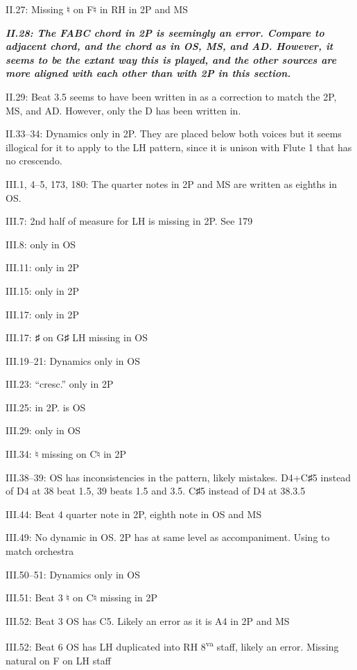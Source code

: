 \documentclass[twoside]{article}
\newcommand\dynmark[1]{\scalebox{0.9}{#1}{\kern1pt}}
\begin{document}
\begin{hangparas}{15pt}{1}
\begin{multicols}{2}
II.27: Missing ♮ on F♮ in RH in 2P and MS

\textbf{\textit{II.28: The FABC chord in 2P is seemingly an error. Compare to adjacent chord, and the chord as in OS, MS, and AD. However, it seems to be the extant way this is played, and the other sources are more aligned with each other than with 2P in this section.}}

II.29: Beat 3.5 seems to have been written in as a correction to match the 2P, MS, and AD. However, only the D has been written in.

II.33--34: Dynamics only in 2P. They are placed below both voices but it seems illogical for it to apply to the LH pattern, since it is unison with Flute 1 that has no crescendo.

III.1, 4--5, 173, 180: The quarter notes in 2P and MS are written as eighths in OS.

III.7: 2nd half of measure for LH is missing in 2P. See 179

III.8: \dynmark{\mf} only in OS

III.11: \dynmark{\ff} only in 2P

III.15: \dynmark{\f} only in 2P	

III.17: \dynmark{\p} only in 2P

III.17: ♯ on G♯ LH missing in OS

III.19--21: Dynamics only in OS

III.23: ``cresc.'' only in 2P

III.25: \dynmark{\f} in 2P. \dynmark{\ff} is OS

III.29: \dynmark{\ff} only in OS

III.34: ♮ missing on C♮ in 2P

III.38--39: OS has inconsistencies in the pattern, likely mistakes. D4+C♯5 instead of D4 at 38 beat 1.5, 39 beats 1.5 and 3.5. C♯5 instead of D4 at 38.3.5

III.44: Beat 4 quarter note in 2P, eighth note in OS and MS

III.49: No dynamic in OS. 2P has \dynmark{\pp} at same level as accompaniment. Using \dynmark{\p} to match orchestra

III.50--51: Dynamics only in OS

III.51: Beat 3 ♮ on C♮ missing in 2P

III.52: Beat 3 OS has C5. Likely an error as it is A4 in 2P and MS

III.52: Beat 6 OS has LH duplicated into RH 8\textsuperscript{va} staff, likely an error. Missing natural on F on LH staff


\end{multicols}
\end{hangparas}
\end{document}
